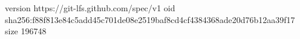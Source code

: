 version https://git-lfs.github.com/spec/v1
oid sha256:f88f813e84c5add45c701de08e2519baf8cd4cf4384368ade20d76b12aa39f17
size 196748
